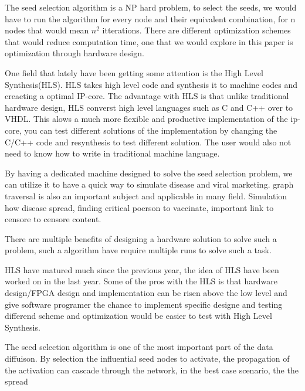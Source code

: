 The seed selection algorithm is a NP hard problem, to select the seeds, we would have to run the algorithm for every node and their equivalent combination, for n nodes that would mean $n^2$ itterations. There are different optimization schemes that would reduce computation time, one that we would explore in this paper is optimization through hardware design. 

One field that lately have been getting some attention is the High Level Synthesis(HLS).  HLS takes high level code and synthesis it to machine codes and creaeting a optimal IP-core. The advantage with HLS is that unlike traditional hardware design, HLS converst high level languages such as C and C++ over to VHDL. This alows a much more flexible and productive implementation of the ip-core, you can test different solutions of the implementation by changing the C/C++ code and resynthesis to test different solution. The user would also not need to know how to write in traditional machine language. 

By having a dedicated machine designed to solve the seed selection problem, we can utilize it to have a quick way to simulate disease and viral marketing. graph traversal is also an important subject and applicable in many field. Simulation how disease spread, finding critical poerson to vaccinate, important link to censore to censore content. 

There are multiple benefits of designing a hardware solution to solve such a problem, such a algorithm have require multiple runs to solve such a task.


HLS have matured much since the previous year, the idea of HLS have been worked on in the last year. Some of the pros with the HLS is that hardware design/FPGA design and implementation can be risen above the low level and give software programer the chance to implement specific designe and testing differend scheme and optimization would be easier to test with High Level Synthesis.

The seed selection algorithm is one of the most important part of the data diffuison. By selection the influential seed nodes to activate, the propagation of the activation can cascade through the network, in the best case scenario, the the spread 